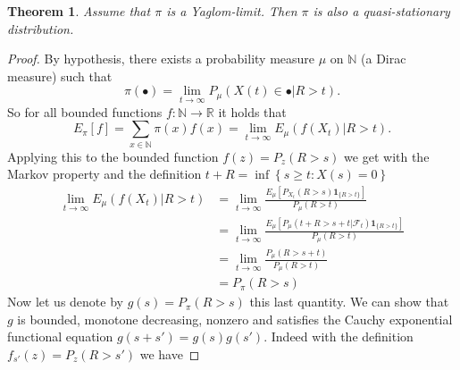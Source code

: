 \documentclass[12pt,a4paper]{scrartcl}
\newtheorem{theorem}{Theorem}[section]
\numberwithin{equation}{section}
\newcommand{\R}{\mathbb{R}} %
\newcommand{\N}{\mathbb{N}} %
\begin{document}
\begin{theorem}
Assume that $\pi$ is a Yaglom-limit. Then $\pi$ is also a quasi-stationary distribution.
\end{theorem}
\begin{proof}
By hypothesis, there exists a probability measure $\mu$ on $\N$ (a Dirac measure) such that
$$ \pi\left(\bullet\right) = \lim_{t \to \infty} P_{\mu}\left(X\left(t\right) \in \bullet | R > t \right). $$
So for all bounded functions $f:\N \to \R$ it holds that 
$$ E_{\pi}\left[f\right] = \sum_{x \in \N} \pi\left(x\right) f\left(x\right) = \lim_{t \to \infty} E_{\mu}\left(f\left(X_t\right) | R > t \right). $$
Applying this to the bounded function $f\left(z\right) = P_z\left(R > s\right)$ we get with the Markov property and the definition $ t + R = \inf\left\{ s \geq t : X\left(s\right) = 0 \right\} $
\begin{align*}
\lim_{t \to \infty} E_{\mu} \left(f\left(X_t\right) | R > t \right) &= \lim_{t \to \infty} \frac{E_{\mu}\left[P_{X_t}\left(R > s\right) \textbf{1}_{\lbrace R > t \rbrace} \right]}{P_{\mu}\left(R > t \right)} \\
&= \lim_{t \to \infty} \frac{ E_{\mu} \left[ P_{\mu}\left(t + R > s +t | \mathcal{F}_t \right) \textbf{1}_{\lbrace R > t \rbrace}  \right] }{P_{\mu}\left(R > t \right)} \\
&= \lim_{t \to \infty} \frac{P_{\mu}\left(R > s+ t \right)}{ P_{\mu}\left( R > t\right)} \\
&= P_{\pi}\left( R > s\right)
\end{align*}
Now let us denote by $g\left(s\right) = P_{\pi}\left(R > s\right)$ this last quantity. We can show that $g$ is bounded, monotone decreasing, nonzero and satisfies the Cauchy exponential functional equation $g\left(s + s'\right) = g\left(s\right) g\left(s'\right).$ Indeed with the definition $f_{s'}\left(z\right) = P_{z}\left(R > s' \right) $ we have

\end{proof}
\end{document}
